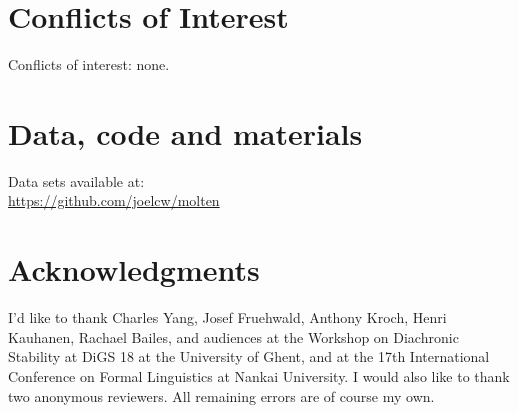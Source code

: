 \documentclass{artikel3}
\begin{document}
\section*{Conflicts of Interest}

Conflicts of interest: none.

\section*{Data, code and materials}

Data sets available at: \\
\url{https://github.com/joelcw/molten}\\


\section*{Acknowledgments}

I'd like to thank Charles Yang, Josef Fruehwald, Anthony Kroch, Henri Kauhanen, Rachael Bailes, and audiences at the Workshop on Diachronic Stability at DiGS 18 at the University of Ghent, and at the 17th International Conference on Formal Linguistics at Nankai University. I would also like to thank two anonymous reviewers. All remaining errors are of course my own.






%

%
  

\pagebreak 
\end{document}
